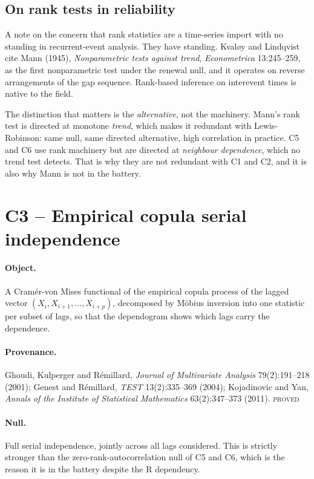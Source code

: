\documentclass[11pt,a4paper]{article}
\newcommand{\PROVED}{\textsc{\textcolor{blue!55!black}{proved}}}
\begin{document}
\subsection{On rank tests in reliability}

A note on the concern that rank statistics are a time-series import with no standing in
recurrent-event analysis. They have standing. Kvaløy and Lindqvist cite Mann (1945),
\emph{Nonparametric tests against trend}, \emph{Econometrica} 13:245--259, as the first
nonparametric test under the renewal null, and it operates on reverse arrangements of
the gap sequence. Rank-based inference on interevent times is native to the field.

The distinction that matters is the \emph{alternative}, not the machinery. Mann's rank
test is directed at monotone \emph{trend}, which makes it redundant with Lewis-Robinson:
same null, same directed alternative, high correlation in practice. C5 and C6 use rank
machinery but are directed at \emph{neighbour dependence}, which no trend test detects.
That is why they are not redundant with C1 and C2, and it is also why Mann is not in the
battery.

\section{C3 -- Empirical copula serial independence}

\paragraph{Object.} A Cramér-von Mises functional of the empirical copula process of the
lagged vector $(X_i, X_{i+1}, \dots, X_{i+p})$, decomposed by Möbius inversion into
one statistic per subset of lags, so that the dependogram shows which lags carry the
dependence.

\paragraph{Provenance.} Ghoudi, Kulperger and Rémillard, \emph{Journal of Multivariate
Analysis} 79(2):191--218 (2001); Genest and Rémillard, \emph{TEST} 13(2):335--369
(2004); Kojadinovic and Yan, \emph{Annals of the Institute of Statistical Mathematics}
63(2):347--373 (2011). \PROVED

\paragraph{Null.} Full serial independence, jointly across all lags considered. This is
strictly stronger than the zero-rank-autocorrelation null of C5 and C6, which is the
reason it is in the battery despite the R dependency.
\end{document}
